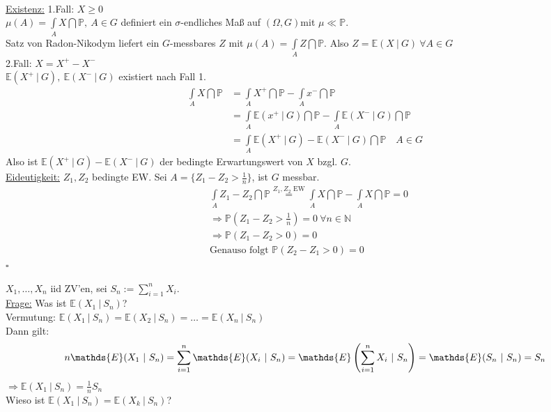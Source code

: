 \\
\uline{Existenz:} 1.Fall: $X\ge 0$\\
$\mu(A)=\int\limits_AX\dint\mathds{P},~A\in G$ definiert ein $\sigma$-endliches Maß auf $(\Omega,G)$mit $\mu \ll \mathds{P}$.\\
Satz von Radon-Nikodym liefert ein $G$-messbares $Z$ mit $\mu(A)=\int\limits_A Z\dint\mathds{P}$. Also $Z=\mathds{E}(X~|~G)~\forall A\in G$\\
2.Fall: $X=X^+-X^-$\\
$\mathds{E}(X^+~|~G),~\mathds{E}(X^-~|~G)$ existiert nach Fall 1.
\begin{equation*}
\begin{aligned}
	\int\limits_AX\dint\mathds{P} &= \int\limits_AX^+\dint\mathds{P}-\int\limits_Ax^-\dint\mathds{P}\\
	&= \int\limits_A\mathds{E}(x^+~|~G)\dint\mathds{P}-\int\limits_A\mathds{E}(X^-~|~G)\dint\mathds{P}\\
	&= \int\limits_A\mathds{E}(X^+~|~G)-\mathds{E}(X^-~|~G)\dint\mathds{P}\quad A\in G
\end{aligned}
\end{equation*}
Also ist $\mathds{E}(X^+~|~G)-\mathds{E}(X^-~|~G)$ der bedingte Erwartungswert von $X$ bzgl. $G$.\\
\uline{Eideutigkeit:} $Z_1,Z_2$ bedingte EW. Sei $A=\{Z_1-Z_2>\frac{1}{n}\}$, ist $G$ messbar.
\begin{equation*}
\begin{aligned}
	&\int\limits_{A}Z_1-Z_2\dint\mathds{P}\stackrel{Z_1,Z_2\text{ EW}}{=} \int\limits_AX\dint\mathds{P}-\int\limits_AX\dint\mathds{P}=0\\
	&\Rightarrow \mathds{P}(Z_1-Z_2>\frac{1}{n})=0~\forall n\in \mathds{N}\\
	&\Rightarrow \mathds{P}(Z_1-Z_2>0)=0\\
	&\text{Genauso folgt } \mathds{P}(Z_2-Z_1>0)=0
\end{aligned}
\end{equation*}
\hfill $\square$

$X_1,\dots,X_n $ iid ZV'en, sei $S_n:=\sum\limits_{i=1}^{n}X_i$.\\
\uline{Frage:} Was ist $\mathds{E}(X_1~|~S_n)$?\\
Vermutung: $\mathds{E}(X_1~|~S_n)=\mathds{E}(X_2~|~S_n)=\dots=\mathds{E}(X_n~|~S_n)$\\
Dann gilt: \[n\mathds{E}(X_1~|~S_n)=\sum_{i=1}^{n}\mathds{E}(X_i~|~S_n)=\mathds{E}\enbrace{\sum_{i=1}^{n}X_i~|~S_n}=\mathds{E}(S_n~|~S_n)=S_n\]
$\Rightarrow \mathds{E}(X_1~|~S_n)=\frac{1}{n}S_n$\\
Wieso ist $\mathds{E}(X_1~|~S_n)=\mathds{E}(X_k~|~S_n)$?\\

